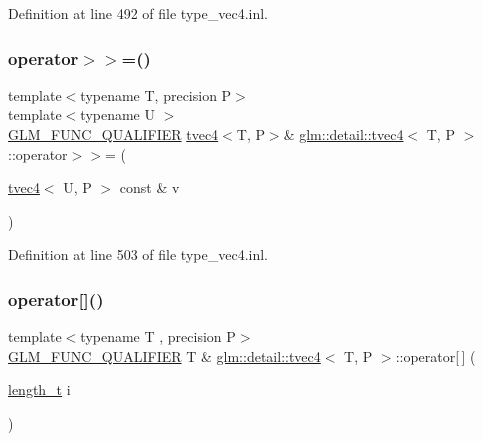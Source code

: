 Definition at line 492 of file type\+\_\+vec4.\+inl.

\mbox{\label{structglm_1_1detail_1_1tvec4_a080d672296e86beecd2d91b75bc0e843}} 
\subsubsection{\texorpdfstring{operator$>$$>$=()}{operator>>=()}\hspace{0.1cm}{\footnotesize\ttfamily [4/4]}}
{\footnotesize\ttfamily template$<$typename T, precision P$>$ \\
template$<$typename U $>$ \\
\hyperlink{setup_8hpp_a33fdea6f91c5f834105f7415e2a64407}{G\+L\+M\+\_\+\+F\+U\+N\+C\+\_\+\+Q\+U\+A\+L\+I\+F\+I\+ER} \hyperlink{structglm_1_1detail_1_1tvec4}{tvec4}$<$T, P$>$\& \hyperlink{structglm_1_1detail_1_1tvec4}{glm\+::detail\+::tvec4}$<$ T, P $>$\+::operator$>$$>$= (\begin{DoxyParamCaption}\item[{\hyperlink{structglm_1_1detail_1_1tvec4}{tvec4}$<$ U, P $>$ const \&}]{v }\end{DoxyParamCaption})}



Definition at line 503 of file type\+\_\+vec4.\+inl.

\mbox{\label{structglm_1_1detail_1_1tvec4_ab3acad4916f2eb3d5e5c438f714eefce}} 
\subsubsection{\texorpdfstring{operator[]()}{operator[]()}\hspace{0.1cm}{\footnotesize\ttfamily [1/2]}}
{\footnotesize\ttfamily template$<$typename T , precision P$>$ \\
\hyperlink{setup_8hpp_a33fdea6f91c5f834105f7415e2a64407}{G\+L\+M\+\_\+\+F\+U\+N\+C\+\_\+\+Q\+U\+A\+L\+I\+F\+I\+ER} T \& \hyperlink{structglm_1_1detail_1_1tvec4}{glm\+::detail\+::tvec4}$<$ T, P $>$\+::operator\mbox{[}$\,$\mbox{]} (\begin{DoxyParamCaption}\item[{\hyperlink{namespaceglm_a090a0de2260835bee80e71a702492ed9}{length\+\_\+t}}]{i }\end{DoxyParamCaption})}



